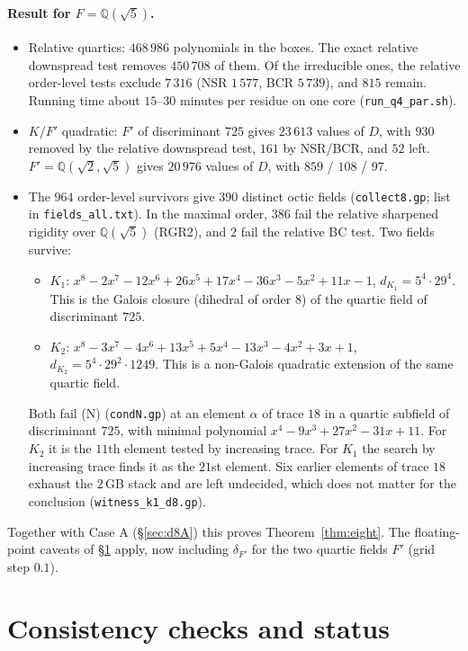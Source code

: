 \documentclass[11pt]{amsart}
\theoremstyle{definition}
\newcommand{\Q}{\mathbb{Q}}
\newcommand{\file}[1]{\texttt{#1}}
\begin{document}
\paragraph{Result for $F=\Q(\sqrt5)$.}
\begin{itemize}[leftmargin=*]
\item Relative quartics: $468\,986$ polynomials in the boxes.  The exact relative downspread
  test removes $450\,708$ of them.  Of the irreducible ones, the relative order-level tests
  exclude $7\,316$ (NSR $1\,577$, BCR $5\,739$), and $815$ remain.  Running time about
  $15$--$30$ minutes per residue on one core (\file{run\_q4\_par.sh}).
\item $K/F'$ quadratic: $F'$ of discriminant $725$ gives $23\,613$ values of $D$, with $930$
  removed by the relative downspread test, $161$ by NSR/BCR, and $52$ left.  $F'=\Q(\sqrt2,\sqrt5)$
  gives $20\,976$ values of $D$, with $859$ / $108$ / $97$.
\item The $964$ order-level survivors give $390$ distinct octic fields
  (\file{collect8.gp}; list in \file{fields\_all.txt}).  In the maximal order,
  $386$ fail the relative sharpened rigidity over $\Q(\sqrt5)$ (RGR2), and $2$ fail the relative
  BC test.  Two fields survive:
  \begin{itemize}
  \item $K_1$: $x^8-2x^7-12x^6+26x^5+17x^4-36x^3-5x^2+11x-1$, $d_{K_1}=5^4\cdot29^4$.  This is the
    Galois closure (dihedral of order $8$) of the quartic field of discriminant $725$.
  \item $K_2$: $x^8-3x^7-4x^6+13x^5+5x^4-13x^3-4x^2+3x+1$, $d_{K_2}=5^4\cdot29^2\cdot1249$.
    This is a non-Galois quadratic extension of the same quartic field.
  \end{itemize}
  Both fail (N) (\file{condN.gp}) at an element $\alpha$ of trace $18$ in a quartic
  subfield of discriminant $725$, with minimal polynomial $x^4-9x^3+27x^2-31x+11$.  For $K_2$
  it is the $11$th element tested by increasing trace.  For $K_1$ the search by increasing
  trace finds it as the $21$st element.  Six earlier elements of trace $18$ exhaust the
  $2$\,GB stack and are left undecided, which does not matter for the conclusion
  (\file{witness\_k1\_d8.gp}).
\end{itemize}
Together with Case A (\S\ref{sec:d8A}) this proves Theorem~\ref{thm:eight}.  The
floating-point caveats of \S\ref{sec:status} apply, now including $\delta_{F'}$ for the two
quartic fields $F'$ (grid step $0.1$).

\section{Consistency checks and status}\label{sec:status}
\end{document}
